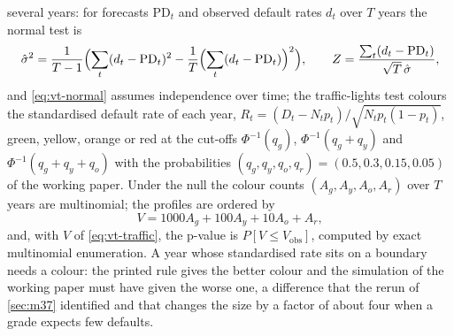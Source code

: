 several years: for forecasts $\mathrm{PD}_t$ and observed default rates $d_t$ over $T$ years the normal test is
\begin{equation}
  \hat\sigma^2=\frac1{T-1}\Bigl(\sum_t(d_t-\mathrm{PD}_t)^2-\frac1T\Bigl(\sum_t(d_t-\mathrm{PD}_t)\Bigr)^2\Bigr),\qquad Z=\frac{\sum_t(d_t-\mathrm{PD}_t)}{\sqrt T\,\hat\sigma},
  \label{eq:vt-normal}
\end{equation}
and \cref{eq:vt-normal} assumes independence over time; the traffic-lights test colours the standardised default rate of each year, $R_t=(D_t-N_tp_t)/\sqrt{N_tp_t(1-p_t)}$, green, yellow, orange or red at the cut-offs
$\Phi^{-1}(q_g)$, $\Phi^{-1}(q_g+q_y)$ and $\Phi^{-1}(q_g+q_y+q_o)$ with the probabilities $(q_g,q_y,q_o,q_r)=(0.5,0.3,0.15,0.05)$ of the working paper. Under the null the
colour counts $(A_g,A_y,A_o,A_r)$ over $T$ years are multinomial; the profiles are ordered by
\begin{equation}
  V=1000A_g+100A_y+10A_o+A_r,
  \label{eq:vt-traffic}
\end{equation}
and, with $V$ of \cref{eq:vt-traffic}, the p-value is $P[V\le V_{\mathrm{obs}}]$, computed by exact multinomial enumeration. A year whose standardised rate sits on a boundary needs a colour: the printed rule
gives the better colour and the simulation of the working paper must have given the worse one, a difference that the rerun of \cref{sec:m37} identified and that changes the
size by a factor of about four when a grade expects few defaults.


